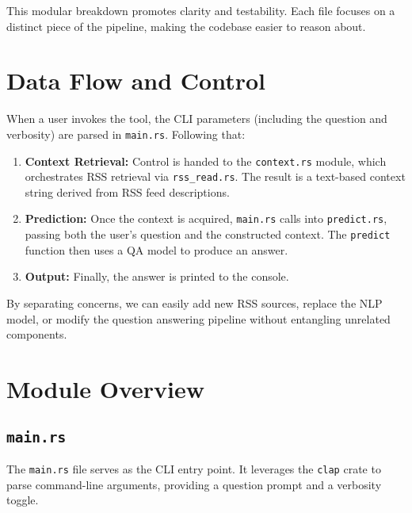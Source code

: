 \noindent
This modular breakdown promotes clarity and testability. Each file focuses on a distinct piece of the pipeline, making the codebase easier to reason about.

\section{Data Flow and Control}
When a user invokes the tool, the CLI parameters (including the question and verbosity) are parsed in \lstinline{main.rs}. Following that:

\begin{enumerate}
    \item \textbf{Context Retrieval:} Control is handed to the \lstinline{context.rs} module, which orchestrates RSS retrieval via \lstinline{rss_read.rs}. The result is a text-based context string derived from RSS feed descriptions.
    \item \textbf{Prediction:} Once the context is acquired, \lstinline{main.rs} calls into \lstinline{predict.rs}, passing both the user’s question and the constructed context. The \lstinline{predict} function then uses a QA model to produce an answer.
    \item \textbf{Output:} Finally, the answer is printed to the console.
\end{enumerate}

By separating concerns, we can easily add new RSS sources, replace the NLP model, or modify the question answering pipeline without entangling unrelated components.

\section{Module Overview}

\subsection{\lstinline{main.rs}}
The \lstinline{main.rs} file serves as the CLI entry point. It leverages the \lstinline{clap} crate to parse command-line arguments, providing a question prompt and a verbosity toggle.

